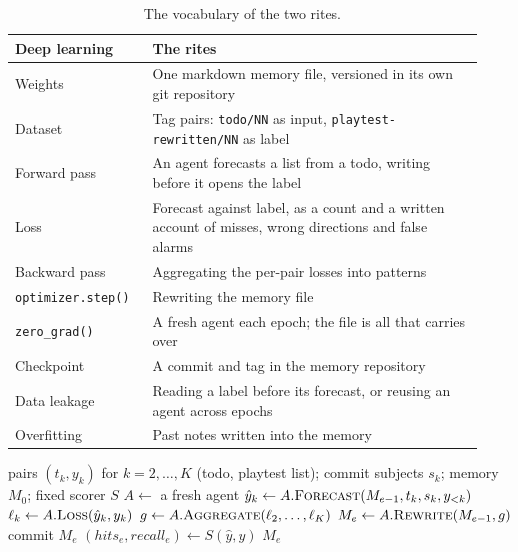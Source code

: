 \documentclass[10pt]{article}
\begin{document}
\begin{table}[t]
  \caption{The vocabulary of the two rites.}
  \label{tab:analogy}
  \centering
  \small
  \begin{tabular}{@{}p{0.27\linewidth}p{0.66\linewidth}@{}}
    \toprule
    Deep learning & The rites \\
    \midrule
    Weights & One markdown memory file, versioned in its own git repository \\
    Dataset & Tag pairs: \texttt{todo/NN} as input, \texttt{playtest-rewritten/NN} as label \\
    Forward pass & An agent forecasts a list from a todo, writing before it opens the label \\
    Loss & Forecast against label, as a count and a written account of misses, wrong directions and false alarms \\
    Backward pass & Aggregating the per-pair losses into patterns \\
    \texttt{optimizer.step()} & Rewriting the memory file \\
    \texttt{zero\_grad()} & A fresh agent each epoch; the file is all that carries over \\
    Checkpoint & A commit and tag in the memory repository \\
    Data leakage & Reading a label before its forecast, or reusing an agent across epochs \\
    Overfitting & Past notes written into the memory \\
    \bottomrule
  \end{tabular}
\end{table}

\begin{algorithm}[t]
  \caption{The First Rite: train the memory on past pairs}
  \label{alg:first}
  \small
  \begin{algorithmic}[1]
    \Require pairs $(t_k, y_k)$ for $k = 2, \dots, K$ (todo, playtest list); commit subjects $s_k$; memory $M_0$; fixed scorer $S$
      \State $A \gets$ a fresh agent 
        \State $\hat{y}_k \gets A.\textsc{Forecast}(M_{e-1}, t_k, s_k, y_{<k})$ 
        \State $\ell_k \gets A.\textsc{Loss}(\hat{y}_k, y_k)$ 
      \EndFor
      \State $g \gets A.\textsc{Aggregate}(\ell_2, \dots, \ell_K)$ 
      \State $M_e \gets A.\textsc{Rewrite}(M_{e-1}, g)$ 
      \State commit $M_e$ 
      \State $(\mathit{hits}_e, \mathit{recall}_e) \gets S(\hat{y}, y)$ 
        \State \Return $M_e$
      \EndIf
    \EndFor
  \end{algorithmic}
\end{algorithm}
\end{document}
